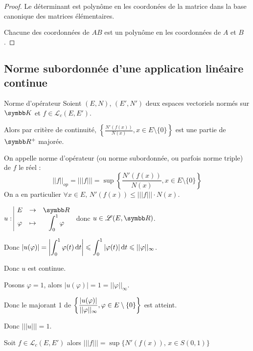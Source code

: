 \begin{proof}
    Le déterminant est polynôme en les coordonées de la matrice dans la base canonique des 
    matrices élémentaires. 

    \svspace Chacune des coordonnées de $AB$ est un polynôme en les coordonnées de $A$ et $B$.
\end{proof}

\subsection{Norme subordonnée d'une application linéaire continue}

\begin{definition}{Norme d'opérateur}{}
    Soient $(E, N)$, $(E', N')$ deux espaces vectoriels normés sur $\K$ et $f \in \mathscr L_c(E, E')$.

    \avspace Alors par critère de continuité, $\left\{ \frac{N'(f(x))}{N(x)}, x \in E \setminus \{0\} \right\}$ est
    une partie de $\R^+$ majorée. 

    On appelle norme d'opérateur (ou norme subordonnée, ou parfois norme triple) de $f$ le réel : 
    \[||f||_{op} = |||f||| = \sup \left\{\frac{N'(f(x))}{N(x)}, x \in E \setminus \{0\} \right\}\]
    On a en particulier $\forall x \in E, \, N'(f(x)) \leqslant |||f||| \cdot N(x)$.
\end{definition}

\begin{exemple}
    $\fonction u E \R \varphi {\int_0^1 \varphi}$ donc $u \in \mathscr L(E, \R)$. 

    \avspace Donc $\displaystyle |u(\varphi)| = \left| \int_0^1 \varphi(t) \,\mathrm{d}t \right| \leqslant \int_0^1 |\varphi(t)| \,\mathrm{d}t \leqslant ||\varphi||_\infty$.

    Donc $u$ est continue. 

    Posons $\varphi = 1$, alors $|u(\varphi)| = 1 = ||\varphi||_\infty$.

    Donc le majorant 1 de $\displaystyle \left\{ \frac{|u(\varphi)|}{||\varphi||_\infty}, \varphi \in E \setminus \{0\} \right\}$ est atteint. 

    Donc $|||u||| = 1$.
\end{exemple}

\begin{proposition}{}{}
    Soit $f \in \mathscr L_c(E, E')$ alors $|||f||| = \sup \{ N'(f(x)), \, x \in S(0, 1) \}$
\end{proposition}


